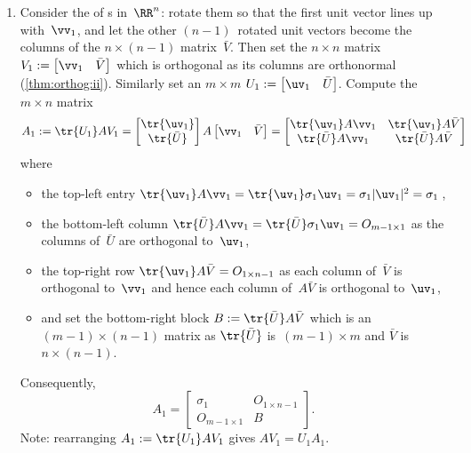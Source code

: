 \begin{enumerate}
\item Consider the  of s in~\(\RR^n\): rotate them so that the first unit vector lines up with~\(\vv_1\), and let the other \((n-1)\)~rotated unit vectors become the columns of the \(n\times(n-1)\) matrix~\(\bar V\).
Then set the \(n\times n\) matrix
\(V_1:=\begin{bmatrix}\vv_1&\bar V\end{bmatrix}\) which is orthogonal as its columns are orthonormal (\cref{thm:orthog:ii}).
Similarly set an \(m\times m\) 
\(U_1:=\begin{bmatrix}\uv_1&\bar U\end{bmatrix}\).
Compute the \(m\times n\) matrix
\begin{equation*}
A_1:=\tr{U_1}AV_1
=\begin{bmatrix} \tr{\uv_1}\\\tr{\bar U} \end{bmatrix}A
\begin{bmatrix} \vv_1 &\bar V \end{bmatrix}
=\begin{bmatrix} \tr{\uv_1}A\vv_1 & \tr{\uv_1}A\bar V
\\\tr{\bar U}A\vv_1&\tr{\bar U}A\bar V \end{bmatrix}
\end{equation*}
where
\begin{itemize}
\item the top-left entry \(\tr{\uv_1}A\vv_1=\tr{\uv_1}\sigma_1\uv_1=\sigma_1|\uv_1|^2=\sigma_1\)\,,
\item the bottom-left column \(\tr{\bar U}A\vv_1=\tr{\bar U}\sigma_1\uv_1=O_{m-1\times 1}\) as the columns of~\(\bar U\) are orthogonal to~\(\uv_1\),
\item the top-right row \(\tr{\uv_1}A\bar V=O_{1\times n-1}\) as each column of~\(\bar V\) is orthogonal to~\(\vv_1\) and hence each column of~\(A\bar V\) is orthogonal to~\(\uv_1\),
\item and set the bottom-right block \(B:=\tr{\bar U}A\bar V\) which is an \((m-1)\times(n-1)\) matrix as \(\tr{\bar U}\) is~\((m-1)\times m\) and \(\bar V\) is \(n\times(n-1)\).
\end{itemize}
Consequently, 
\begin{equation*}
A_1=\begin{bmatrix} \sigma_1&O_{1\times n-1}
\\O_{m-1\times 1}&B \end{bmatrix}.
\end{equation*}%
Note: rearranging \(A_1:=\tr{U_1}AV_1\) gives \(AV_1=U_1A_1\).


\end{enumerate}

